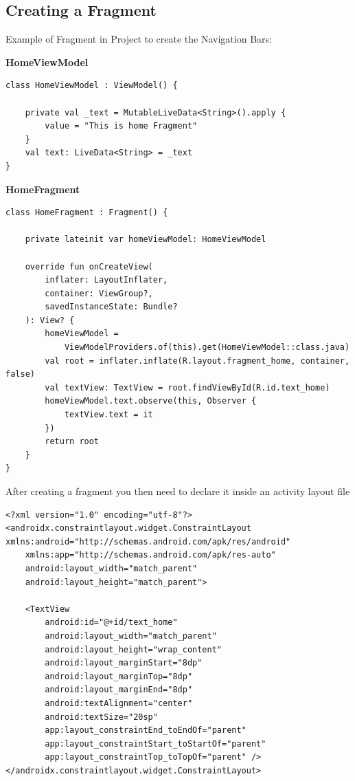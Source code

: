 \subsection{Creating a Fragment}

Example of Fragment in Project to create the Navigation Bars:\newline

\textbf{HomeViewModel}
\begin{verbatim}
class HomeViewModel : ViewModel() {

    private val _text = MutableLiveData<String>().apply {
        value = "This is home Fragment"
    }
    val text: LiveData<String> = _text
}
\end{verbatim}


\textbf{HomeFragment}
\begin{verbatim}
class HomeFragment : Fragment() {

    private lateinit var homeViewModel: HomeViewModel

    override fun onCreateView(
        inflater: LayoutInflater,
        container: ViewGroup?,
        savedInstanceState: Bundle?
    ): View? {
        homeViewModel =
            ViewModelProviders.of(this).get(HomeViewModel::class.java)
        val root = inflater.inflate(R.layout.fragment_home, container, false)
        val textView: TextView = root.findViewById(R.id.text_home)
        homeViewModel.text.observe(this, Observer {
            textView.text = it
        })
        return root
    }
}
\end{verbatim}

After creating a fragment you then need to declare it inside an activity layout file
\begin{verbatim}
<?xml version="1.0" encoding="utf-8"?>
<androidx.constraintlayout.widget.ConstraintLayout xmlns:android="http://schemas.android.com/apk/res/android"
    xmlns:app="http://schemas.android.com/apk/res-auto"
    android:layout_width="match_parent"
    android:layout_height="match_parent">

    <TextView
        android:id="@+id/text_home"
        android:layout_width="match_parent"
        android:layout_height="wrap_content"
        android:layout_marginStart="8dp"
        android:layout_marginTop="8dp"
        android:layout_marginEnd="8dp"
        android:textAlignment="center"
        android:textSize="20sp"
        app:layout_constraintEnd_toEndOf="parent"
        app:layout_constraintStart_toStartOf="parent"
        app:layout_constraintTop_toTopOf="parent" />
</androidx.constraintlayout.widget.ConstraintLayout>
\end{verbatim}

